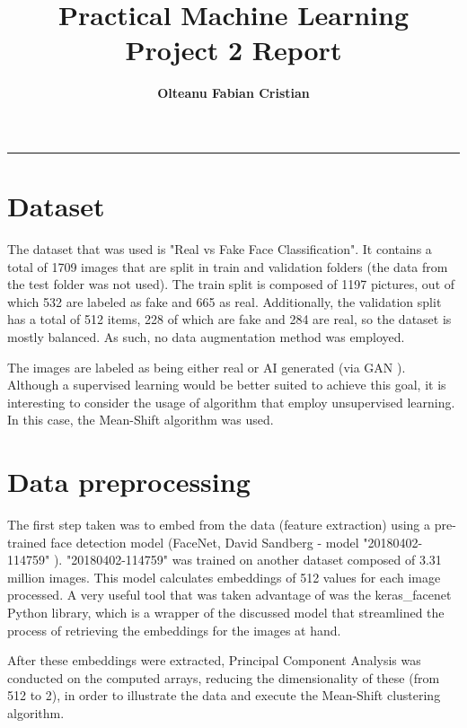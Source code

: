 \documentclass{article}
\author{\textbf{Olteanu Fabian Cristian}}
\affil{FMI, AI Master, Year 1
}
\title{\textbf{\huge Practical Machine Learning Project 2 Report}}
\date{}
\begin{document}
\pagestyle{headings}	
\newpage
\setcounter{page}{1}
\renewcommand{\thepage}{\arabic{page}}


	
	
\setlength{\parskip}{0.5em}
	
\maketitle
	
\noindent\rule{15cm}{0.4pt}

\section{Dataset}
The dataset that was used is "Real vs Fake Face Classification"\cite{dataset}. It contains a total of 1709 images that are split in train and validation folders (the data from the test folder was not used). The train split is composed of 1197 pictures, out of which 532 are labeled as fake and 665 as real. Additionally, the validation split has a total of 512 items, 228 of which are fake and 284 are real, so the dataset is mostly balanced. As such, no data augmentation method was employed.

The images are labeled as being either real or AI generated (via GAN \cite{gan}). Although a supervised learning would be better suited to achieve this goal, it is interesting to consider the usage of algorithm that employ unsupervised learning. In this case, the Mean-Shift algorithm was used.

\section{Data preprocessing}
The first step taken was to embed from the data (feature extraction) using a pre-trained face detection model (FaceNet, David Sandberg - model "20180402-114759" \cite{facenet}). "20180402-114759" was trained on another dataset composed of 3.31 million images. This model calculates embeddings of 512 values for each image processed. A very useful tool that was taken advantage of was the keras\_facenet \cite{kerasfacenet} Python library, which is a wrapper of the discussed model that streamlined the process of retrieving the embeddings for the images at hand. 

After these embeddings were extracted, Principal Component Analysis was conducted on the computed arrays, reducing the dimensionality of these (from 512 to 2), in order to illustrate the data and execute the Mean-Shift clustering algorithm.
\end{document}
